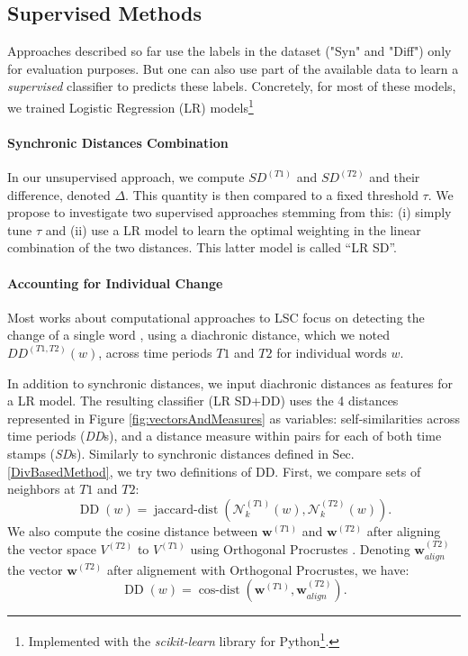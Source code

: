 \documentclass[11pt]{article}
\newcommand{\neigh}[3]{\mathcal{N}_{#1}^{(#2)}\left(#3\right)}
\newcommand{\kneigh}[2]{\neigh{k}{#1}{#2}}
\newcommand{\vectorspaceOne}{V^{(T1)}}
\newcommand{\vectorspaceTwo}{V^{(T2)}}
\newcommand{\reprVector}[2]{\mathbf{#1}^{(#2)}}
\newcommand{\firstTime}{T1}
\newcommand{\secondTime}{T2}
\begin{document}
\subsection{Supervised Methods}
\label{supervised}
Approaches described so far use the labels in the dataset ("Syn" and "Diff") only for evaluation purposes. But one can also use part of the available data to learn a \textit{supervised} classifier to predicts these labels.  Concretely, for most of these models, we trained Logistic Regression (LR) models\footnote{Implemented with the \textit{scikit-learn} library for Python\footnote{\url{https://scikit-learn.org/}}.}


\paragraph{Synchronic Distances Combination}
In our unsupervised approach, we compute $SD^{(\firstTime)}$ and $SD^{(\secondTime)}$ and their difference, denoted $\Delta$. This quantity is then compared to a fixed threshold $\tau$. We propose to investigate two supervised approaches stemming from this: (i) simply tune $\tau$ and (ii) use a LR model to learn the optimal weighting in the linear combination of the two distances. This latter model is called ``LR SD''.

\paragraph{Accounting for Individual Change}
Most works about computational approaches to LSC focus on detecting the change of a single word \citep{tahmasebi-etal-2021-survey}, using a diachronic distance, which we noted $DD^{(\firstTime,\secondTime)}(w)$, across time periods $\firstTime$ and $\secondTime$ for individual words $w$. 

In addition to synchronic distances, we input diachronic distances as features for a LR model. The resulting classifier (LR SD+DD) uses the 4 distances represented in Figure \ref{fig:vectorsAndMeasures} as variables: self-similarities across time periods (\textit{DD}s), and a distance measure within pairs for each of both time stamps (\textit{SD}s). Similarly to synchronic distances defined in Sec. \ref{DivBasedMethod}, we try two definitions of DD. First, we compare sets of neighbors at $\firstTime$ and $\secondTime$: 
\begin{equation*}\operatorname{DD}(w) = \operatorname{jaccard-dist}(\kneigh{\firstTime}{w},\kneigh{\secondTime}{w}).
\end{equation*} 
We also compute the cosine distance between $\reprVector{w}{\firstTime}$ and $\reprVector{w}{\secondTime}$ after aligning the vector space $\vectorspaceTwo$ to $\vectorspaceOne$ using Orthogonal Procrustes \citep{hamilton-etal-2016-diachronic, schlechtweg-etal-2019-wind, schlechtweg-etal-2020-semeval}. Denoting $\reprVector{w}{\secondTime}_{align}$ the vector $\reprVector{w}{\secondTime}$ after alignement with Orthogonal Procrustes, we have:
\begin{equation*}\operatorname{DD}(w) = \operatorname{cos-dist}(\reprVector{w}{\firstTime},\reprVector{w}{\secondTime}_{align}).
\end{equation*} 
\end{document}
